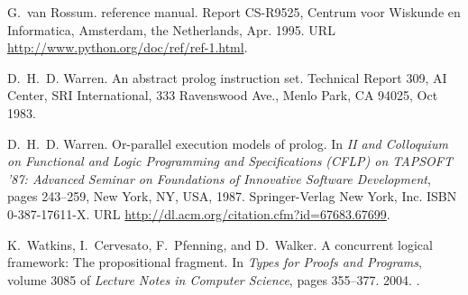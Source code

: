 \documentclass{sigplanconf}
\begin{document}
\begin{thebibliography}{35}
G.~{van Rossum}.
 reference manual.
\newblock Report CS-R9525, Centrum voor Wiskunde en Informatica, Amsterdam, the
  Netherlands, Apr. 1995.
\newblock URL \url{http://www.python.org/doc/ref/ref-1.html}.

D.~H.~D. Warren.
\newblock An abstract prolog instruction set.
\newblock Technical Report 309, AI Center, SRI International, 333 Ravenswood
  Ave., Menlo Park, CA 94025, Oct 1983.

D.~H.~D. Warren.
\newblock Or-parallel execution models of prolog.
\newblock In \emph{II and Colloquium on Functional and Logic Programming and
  Specifications (CFLP) on TAPSOFT '87: Advanced Seminar on Foundations of
  Innovative Software Development}, pages 243--259, New York, NY, USA, 1987.
  Springer-Verlag New York, Inc.
\newblock ISBN 0-387-17611-X.
\newblock URL \url{http://dl.acm.org/citation.cfm?id=67683.67699}.

K.~Watkins, I.~Cervesato, F.~Pfenning, and D.~Walker.
\newblock A concurrent logical framework: The propositional fragment.
\newblock In \emph{Types for Proofs and Programs}, volume 3085 of \emph{Lecture
  Notes in Computer Science}, pages 355--377. 2004.
\newblock {}.

\end{thebibliography}
\end{document}
